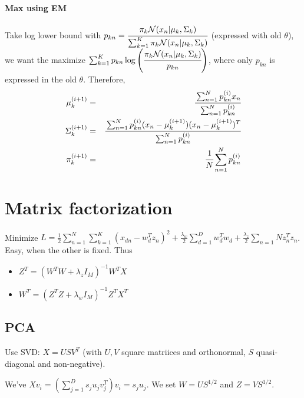 \documentclass[10pt,a4paper,landscape]{article}
\renewcommand{\bf}[1]{\ensuremath{\mathbf{#1}}}
\begin{document}
\begin{multicols*}{4}
\paragraph{Max using EM} Take log lower bound with $p_{kn} = \cfrac{\pi_k\mathcal{N}(x_n | \mu_k, \Sigma_k)}{\sum_{k=1}^K\pi_k\mathcal{N}(x_n | \mu_k, \Sigma_k)}$ (expressed with old $\theta$), we want the maximize $\sum_{k=1}^Kp_{kn}\log\left( \cfrac{\pi_k\mathcal{N}(x_n | \mu_k, \Sigma_k)}{p_{kn}} \right)$, where only $p_{kn}$ is expressed in the old $\theta$. Therefore,
\begin{eqnarray*}
	\mu_k^{(i+1)} &=& \cfrac{\sum_{n=1}^Np_{kn}^{(i)}x_n}{\sum_{n=1}^Np_{kn}^{(i)}}\\
	\Sigma_k^{(i+1)} &=& \cfrac{\sum_{n=1}^N p_{kn}^{(i)} (x_n - \mu_k^{(i+1)})(x_n - \mu_k^{(i+1)})^T}{\sum_{n=1}^N p_{kn}^{(i)}}\\
  	\pi_k^{(i+1)} &=& \cfrac{1}{N}\sum_{n=1}^Np_{kn}^{(i)}
\end{eqnarray*}

\section{Matrix factorization}
Minimize $L = \frac{1}{2}\sum_{n=1}^N\sum_{k=1}^K(x_{dn} - w_d^Tz_n)^2 + \frac{\lambda_w}{2}\sum_{d=1}^Dw_d^Tw_d + \frac{\lambda_z}{2}\sum_{n=1}Nz_n^Tz_n$. Easy, when the other is fixed. Thus
\begin{itemize}
	\item $Z^T = (W^TW + \lambda_zI_M)^{-1}W^TX$
	\item $W^T = (Z^TZ + \lambda_wI_M)^{-1}Z^TX^T$
\end{itemize}

\subsection{PCA}
Use SVD: $X = USV^T$ (with $U,V$ square matriices and orthonormal, $S$ quasi-diagonal and non-negative).

We've $Xv_i = \left(\sum_{j=1}^Ds_ju_jv_j^T\right)v_i = s_ju_j$. We set $W = US^{1/2}$ and $Z = VS^{1/2}$.



\end{multicols*}
\end{document}
